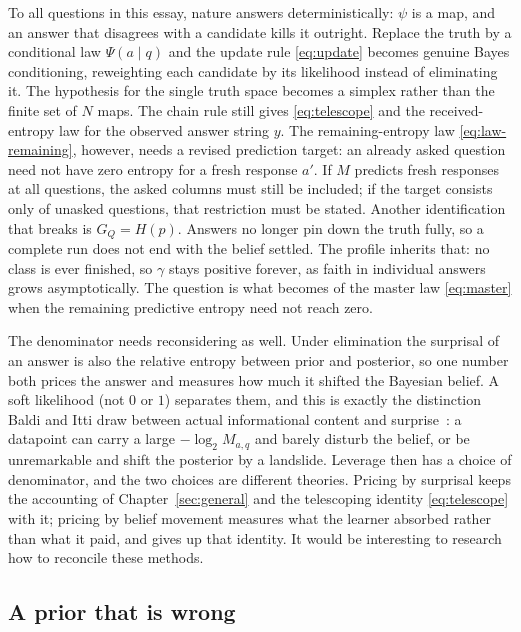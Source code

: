 \documentclass[11pt]{article}
\begin{document}
To all questions in this essay, nature answers deterministically: $\psi$ is a map, and an answer
that disagrees with a candidate kills it outright. Replace the truth by
a conditional law $\Psi(a \mid q)$ and the update rule
\eqref{eq:update} becomes genuine Bayes conditioning, reweighting each candidate by
its likelihood instead of eliminating it. The hypothesis for the single truth space becomes a
simplex rather than the finite set of $N$ maps. The chain rule still
gives \eqref{eq:telescope} and the received-entropy law for the
observed answer string $y$. The remaining-entropy law
\eqref{eq:law-remaining}, however, needs a revised prediction target:
an already asked question need not have zero entropy for a fresh
response $a'$. If $M$ predicts fresh responses at all questions,
the asked columns must still be included; if the target consists
only of unasked questions, that restriction must be stated.
Another identification that breaks is $G_Q = H(p)$. Answers no longer pin down
the truth fully, so a complete run does not end with the belief settled. 
The profile inherits that: no class is ever finished, so $\gamma$ stays positive
forever, as faith in individual answers grows asymptotically. The question
is what becomes of the master law \eqref{eq:master} when the remaining
predictive entropy need not reach zero.

The denominator needs reconsidering as well. Under elimination the
surprisal of an answer is also the relative entropy between prior and
posterior, so one number both prices the answer and measures how much it shifted 
the Bayesian belief. A soft likelihood (not $0$ or $1$) separates them, and this is exactly the
distinction Baldi and Itti draw between actual informational content and
surprise~\cite{baldiitti10}: a datapoint can carry a large $-\log_2 M_{a,q}$
and barely disturb the belief, or be unremarkable and shift the posterior by a landslide.
Leverage then has a choice of denominator, and the two choices are
different theories. Pricing by surprisal keeps the accounting of
Chapter~\ref{sec:general} and the telescoping identity
\eqref{eq:telescope} with it; pricing by belief movement measures what the
learner absorbed rather than what it paid, and gives up that identity.
It would be interesting to research how to reconcile these methods.

\subsection{A prior that is wrong}
\end{document}
